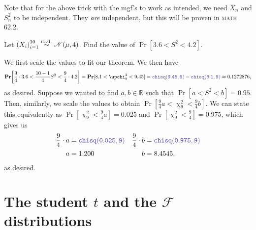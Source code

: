 Note that for the above trick with the mgf's to work as intended, we need \(\overline{X}_n\) and \(S_n^2\) to be independent. 
They \textit{are} independent, but this will be proven in \textsc{math} 62.2. 

\begin{example}
    Let \({(X_i)}_{i=1}^{10} \stackrel{\mathrm{i.i.d.}}{\sim} \mathscr{N}(\mu, 4)\). Find the value of \(\Pr[3.6 < S^2 <4.2]\). 

    We first scale the values to fit our theorem. We then have\[
    \Pr\bigg[\frac{9}{4} \cdot 3.6 < \frac{10-1}{4} S^2 < \frac{9}{4}\cdot 4.2\bigg] = \Pr[8.1 < \upchi_9^2 < 9.45] = \code{chisq(9.45,9)} - \code{chisq(8.1,9)} \approx 0.1272876,
    \]as desired. Suppose we wanted to find \(a,b\in\mathbb{R}\) such that \(\Pr[a<S^2<b] = 0.95\). 
    Then, similarly, we scale the values to obtain \(\Pr[\frac{9}{4} a < \upchi_9^2 <\frac{9}{4} b]\). 
    We can state this equivalently as \(\Pr[\upchi_9^2 < \frac{9}{4}a] = 0.025\) and \(\Pr[\upchi_9^2 < \frac{9}{4} ] = 0.975\), which gives us\begin{align*}
        \frac{9}{4}\cdot a &= \code{chisq(0.025, 9)} & \frac{9}{4}\cdot b &= \code{chisq(0.975,9)} \\ 
        a & = 1.200 & b&= 8.4545,
    \end{align*}as desired. 
\end{example}

\section{The student \(t\) and the \(\mathscr{F}\) distributions}